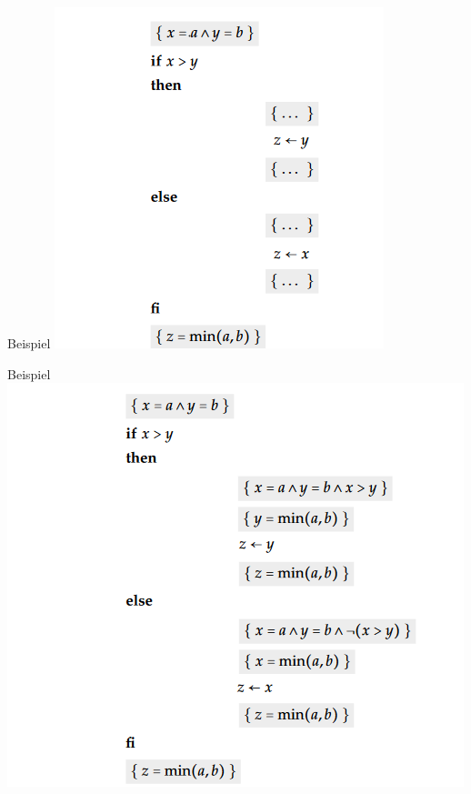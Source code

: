 \documentclass{beamer}
\begin{document}
\begin{frame}{Beispiel}
	\includegraphics[scale=0.6]{images/if_fi.PNG}
\end{frame}		

\begin{frame}{Beispiel}
	\includegraphics[scale=0.6]{images/if_fi_loes.PNG}
\end{frame}		

\end{document}
